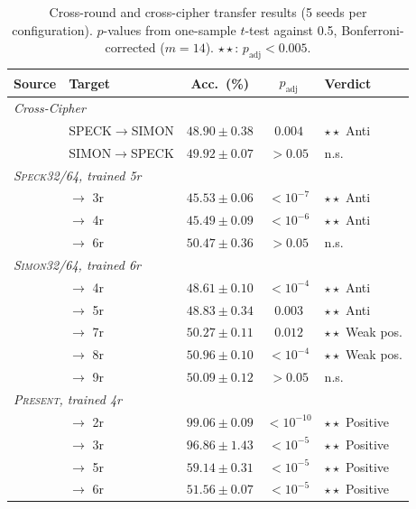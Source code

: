 \documentclass[runningheads]{llncs}
\newcommand{\speck}{\textsc{Speck32/64}}
\newcommand{\simon}{\textsc{Simon32/64}}
\newcommand{\present}{\textsc{Present}}
\begin{document}
\begin{table}[htbp]
\centering
\caption{Cross-round and cross-cipher transfer results (5 seeds per configuration).
         $p$-values from one-sample $t$-test against 0.5, Bonferroni-corrected ($m{=}14$).
         $\star\star$: $p_{\text{adj}}<0.005$.}\label{tab:transfer}
\begin{tabular}{@{}llccl@{}}
\toprule
\textbf{Source} & \textbf{Target} & \textbf{Acc.\ (\%)} & \textbf{$p_{\text{adj}}$} & \textbf{Verdict} \\
\midrule
\multicolumn{5}{l}{\textit{Cross-Cipher}} \\
  & SPECK$\to$SIMON & $48.90 \pm 0.38$ & $0.004$       & $\star\star$ Anti \\
  & SIMON$\to$SPECK & $49.92 \pm 0.07$ & $> 0.05$      & n.s. \\
\midrule
\multicolumn{5}{l}{\textit{\speck, trained 5r}} \\
  & $\to$ 3r  & $45.53 \pm 0.06$ & $< 10^{-7}$  & $\star\star$ Anti \\
  & $\to$ 4r  & $45.49 \pm 0.09$ & $< 10^{-6}$  & $\star\star$ Anti \\
  & $\to$ 6r  & $50.47 \pm 0.36$ & $> 0.05$     & n.s. \\
\midrule
\multicolumn{5}{l}{\textit{\simon, trained 6r}} \\
  & $\to$ 4r  & $48.61 \pm 0.10$ & $< 10^{-4}$  & $\star\star$ Anti \\
  & $\to$ 5r  & $48.83 \pm 0.34$ & $0.003$       & $\star\star$ Anti \\
  & $\to$ 7r  & $50.27 \pm 0.11$ & $0.012$       & $\star\star$ Weak pos. \\
  & $\to$ 8r  & $50.96 \pm 0.10$ & $< 10^{-4}$  & $\star\star$ Weak pos. \\
  & $\to$ 9r  & $50.09 \pm 0.12$ & $> 0.05$      & n.s. \\
\midrule
\multicolumn{5}{l}{\textit{\present, trained 4r}} \\
  & $\to$ 2r  & $99.06 \pm 0.09$ & $< 10^{-10}$ & $\star\star$ Positive \\
  & $\to$ 3r  & $96.86 \pm 1.43$ & $< 10^{-5}$  & $\star\star$ Positive \\
  & $\to$ 5r  & $59.14 \pm 0.31$ & $< 10^{-5}$  & $\star\star$ Positive \\
  & $\to$ 6r  & $51.56 \pm 0.07$ & $< 10^{-5}$  & $\star\star$ Positive \\
\bottomrule
\end{tabular}
\end{table}
\end{document}
